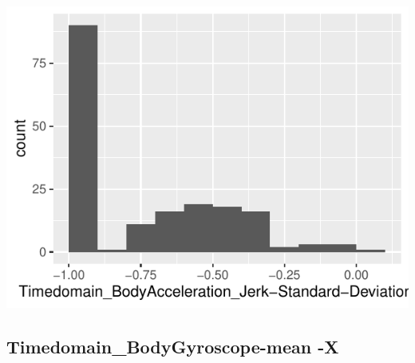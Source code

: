 \documentclass[
]{article}
\begin{document}
\begin{minipage}{0.25 \textwidth}

\includegraphics{codebook_tidydatasub_files/figure-latex/Var-20-Timedomain-BodyAcceleration-Jerk-Standard-Deviation--Z-1.pdf}

\end{minipage}

\noindent\makebox[\linewidth]{\rule{\textwidth}{0.4pt}}

\hypertarget{timedomain_bodygyroscope-mean--x}{%
\subsection{Timedomain\_BodyGyroscope-mean
-X}\label{timedomain_bodygyroscope-mean--x}}
\end{document}
